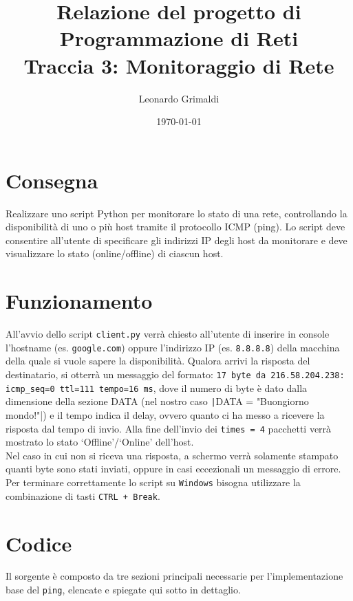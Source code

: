 \documentclass[a4paper,12pt]{report}
\title{Relazione del progetto di Programmazione di Reti 
    \\ Traccia 3: Monitoraggio di Rete}
\author{Leonardo Grimaldi}
\date{\today}
\begin{document}
\maketitle
\tableofcontents
\chapter{Consegna}
Realizzare uno script Python per monitorare lo stato di una rete, controllando la disponibilità di uno o più host tramite il protocollo ICMP (ping).
%
Lo script deve consentire all'utente di specificare gli indirizzi IP degli host da monitorare e deve visualizzare lo stato (online/offline) di ciascun host.
\chapter{Funzionamento}
All'avvio dello script \texttt{client.py} verrà chiesto all'utente di inserire in console l'hostname (es. \texttt{google.com}) oppure l'indirizzo IP (es. \texttt{8.8.8.8}) della macchina della quale si vuole sapere la disponibilità.
%
Qualora arrivi la risposta del destinatario, si otterrà un messaggio del formato: \texttt{17 byte da 216.58.204.238: icmp\_seq=0 ttl=111 tempo=16 ms}, dove il numero di byte è dato dalla dimensione della sezione DATA (nel nostro caso \texttt|DATA = "Buongiorno mondo!"|) e il tempo indica il delay, ovvero quanto ci ha messo a ricevere la risposta dal tempo di invio.
%
Alla fine dell'invio dei \texttt{times = 4} pacchetti verrà mostrato lo stato `Offline'/`Online' dell'host.
%
\\ Nel caso in cui non si riceva una risposta, a schermo verrà solamente stampato quanti byte sono stati inviati, oppure in casi eccezionali un messaggio di errore.
%
Per terminare correttamente lo script su \texttt{Windows} bisogna utilizzare la combinazione di tasti \texttt{CTRL + Break}.
\chapter{Codice}
Il sorgente è composto da tre sezioni principali necessarie per l'implementazione base del \texttt{ping}, elencate e spiegate qui sotto in dettaglio.
\end{document}
